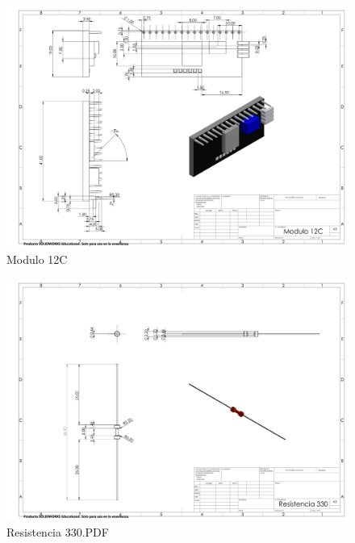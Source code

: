     \begin{figure}[H]
        \centering
        \includegraphics[trim = {10mm 10mm 10mm 10mm},clip,scale=0.150]{16/Img/modulo12C.PDF}
        \caption{Modulo 12C}
       \label{fig:Modulo 12C}
     \end{figure}
    \begin{figure}[H]
        \centering
        \includegraphics[trim = {10mm 10mm 10mm 10mm},clip,scale=0.150]{16/Img/resistencia330.PDF}
        \caption{Resistencia 330.PDF}
        \label{fig:Resistencia 330.PDF}
    \end{figure}
